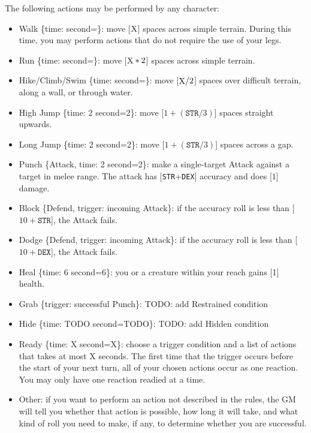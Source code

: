 \documentclass[12pt]{article}
\newcommand{\STR}{\texttt{STR}}
\newcommand{\DEX}{\texttt{DEX}}
\newcommand{\X}{\text{{\lower 0.2mm \hbox{X}}}}
\newcommand{\TIME}[1]{\{time: #1 second\if1=#1{}\else{s}\fi\}}
\newcommand{\TRIG}[1]{\{trigger: #1\}}
\newcommand{\Attack}[1]{\{Attack, time: #1 second\if1=#1{}\else{s}\fi\}}
\newcommand{\Defend}{\{Defend, trigger: incoming Attack\}}
\begin{document}
The following actions may be performed by any character:
\begin{itemize}

\item Walk \TIME{\X}: move [$\X$] spaces across simple terrain. During this time, you may perform actions that do not require the use of your legs.

\item Run \TIME{\X}: move [$\X * 2$] spaces across simple terrain.

\item Hike/Climb/Swim \TIME{\X}: move [$\X / 2$] spaces over difficult terrain, along a wall, or through water.

\item High Jump \TIME{2}: move [$1 + (\STR / 3)$] spaces straight upwards.

\item Long Jump \TIME{2}: move [$1 + (\STR / 3)$] spaces across a gap.

\item Punch \Attack{2}: make a single-target Attack against a target in melee range. The attack has [\STR+\DEX] accuracy and does [$1$] damage.

\item Block \Defend: if the accuracy roll is less than [$10 + \STR$], the Attack fails.

\item Dodge \Defend: if the accuracy roll is less than [$10 + \DEX$], the Attack fails.

\item Heal \TIME{6}: you or a creature within your reach gains [1] health.

\item Grab \TRIG{successful Punch}: TODO: add Restrained condition

\item Hide \TIME{TODO}: TODO: add Hidden condition

\item Ready \TIME{X}: choose a trigger condition and a list of actions that takes at most X seconds. The first time that the trigger occurs before the start of your next turn, all of your chosen actions occur as one reaction. You may only have one reaction readied at a time.

\item Other: if you want to perform an action not described in the rules, the GM will tell you whether that action is possible, how long it will take, and what kind of roll you need to make, if any, to determine whether you are successful.

\end{itemize}
\end{document}
